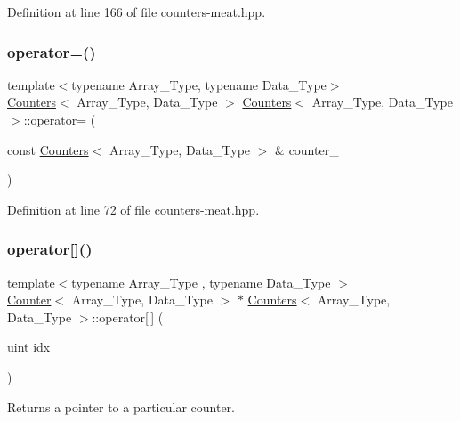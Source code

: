 Definition at line 166 of file counters-\/meat.\+hpp.

\mbox{\label{class_counters_a0edeb22b0b1640f7ada1ef47a30ac486}} 
\subsubsection{\texorpdfstring{operator=()}{operator=()}}
{\footnotesize\ttfamily template$<$typename Array\+\_\+\+Type, typename Data\+\_\+\+Type$>$ \\
\hyperlink{class_counters}{Counters}$<$ Array\+\_\+\+Type, Data\+\_\+\+Type $>$ \hyperlink{class_counters}{Counters}$<$ Array\+\_\+\+Type, Data\+\_\+\+Type $>$\+::operator= (\begin{DoxyParamCaption}\item[{const \hyperlink{class_counters}{Counters}$<$ Array\+\_\+\+Type, Data\+\_\+\+Type $>$ \&}]{counter\+\_\+ }\end{DoxyParamCaption})}



Definition at line 72 of file counters-\/meat.\+hpp.

\mbox{\label{class_counters_a9c3ff72b5e24a299e3c1aecad0ea5eb2}} 
\subsubsection{\texorpdfstring{operator[]()}{operator[]()}}
{\footnotesize\ttfamily template$<$typename Array\+\_\+\+Type , typename Data\+\_\+\+Type $>$ \\
\hyperlink{class_counter}{Counter}$<$ Array\+\_\+\+Type, Data\+\_\+\+Type $>$ $\ast$ \hyperlink{class_counters}{Counters}$<$ Array\+\_\+\+Type, Data\+\_\+\+Type $>$\+::operator\mbox{[}$\,$\mbox{]} (\begin{DoxyParamCaption}\item[{\hyperlink{typedefs_8hpp_a91ad9478d81a7aaf2593e8d9c3d06a14}{uint}}]{idx }\end{DoxyParamCaption})\hspace{0.3cm}{\ttfamily [inline]}}



Returns a pointer to a particular counter. 


